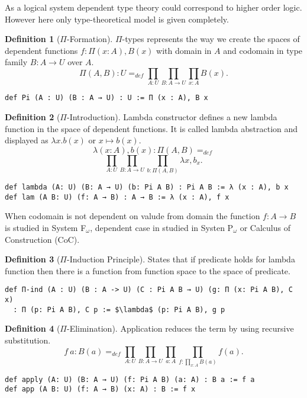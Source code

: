 \documentclass{article}
\theoremstyle{definition}
\newtheorem{definition}{Definition}
\begin{document}
As a logical system dependent type theory could correspond to higher order logic.
However here only type-theoretical model is given completely.

\begin{definition}[$\Pi$-Formation]
$\Pi$-types represents the way we create the spaces of
dependent functions $f: \Pi(x:A), B(x)$ with domain
in $A$ and codomain in type family $B : A \rightarrow U$ over $A$.
$$
  \Pi(A,B) : U =_{def} \prod_{A:U}\prod_{B: A \rightarrow U}\prod_{x:A}B(x).
$$
\begin{lstlisting}[mathescape=true]
def Pi (A : U) (B : A → U) : U := Π (x : A), B x
\end{lstlisting}
\end{definition}

\begin{definition}[$\Pi$-Introduction]
Lambda constructor defines a new lambda function in the space of dependent functions.
It is called lambda abstraction and displayed as $\lambda x. b(x)$ or $x \mapsto b(x)$.
$$
  \lambda (x: A), b(x) : \Pi(A,B) =_{def}
$$
$$
  \prod_{A:U}\prod_{B:A \rightarrow U}\prod_{b:\Pi(A,B)}\lambda x, b_x.
$$
\begin{lstlisting}[mathescape=true]
def lambda (A: U) (B: A → U) (b: Pi A B) : Pi A B := λ (x : A), b x
def lam (A B: U) (f: A → B) : A → B := λ (x : A), f x
\end{lstlisting}
\end{definition}

When codomain is not dependent on valude from domain the function $f: A \rightarrow B$
is studied in System F$_\omega$, dependent case in studied
in Systen P$_\omega$ or Calculus of Construction (CoC).

\begin{definition}[$\Pi$-Induction Principle]
States that if predicate holds for lambda function
then there is a function from function space to the space of predicate.
\begin{lstlisting}[mathescape=true]
def П-ind (A : U) (B : A -> U) (C : Pi A B → U) (g: Π (x: Pi A B), C x)
  : П (p: Pi A B), C p := $\lambda$ (p: Pi A B), g p
\end{lstlisting}
\end{definition}

\begin{definition}[$\Pi$-Elimination]
Application reduces the term by using recursive substitution.
$$
   f\ a : B(a) =_{def} \prod_{A:U}\prod_{B: A \rightarrow U}\prod_{a:A}\prod_{f: \prod_{x:A}B(a)}f(a).
$$
\begin{lstlisting}[mathescape=true]
def apply (A: U) (B: A → U) (f: Pi A B) (a: A) : B a := f a
def app (A B: U) (f: A → B) (x: A) : B := f x
\end{lstlisting}
\end{definition}
\end{document}
